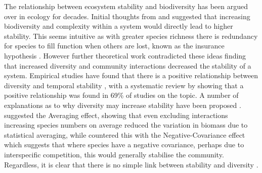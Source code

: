 The relationship between ecosystem stability and biodiversity has been argued over in ecology for decades. Initial thoughts from \cite{Elton1958} and \cite{MacArthur1955} suggested that increasing biodiversity and complexity within a system would directly lead to higher stability. This seems intuitive as with greater species richness there is redundancy for species to fill function when others are lost, known as the insurance hypothesis \citep{Yachi1999}. However further theoretical work contradicted these ideas \citep{May1973} finding that increased diversity and community interactions decreased the stability of a system. Empirical studies have found that there is a positive relationship between diversity and temporal stability \citep{Tilman1994, Tilman2006}, with a systematic review by \cite{Ives2007} showing that a positive relationship was found in 69\% of studies on the topic. A number of explanations as to why diversity may increase stability have been proposed \citep{McCann2000}. \cite{Doak1998} suggested the Averaging effect, showing that even excluding interactions increasing species numbers on average reduced the variation in biomass due to statistical averaging, while \cite{Tilman1998} countered this with the Negative-Covariance effect which suggests that where species have a negative covariance, perhaps due to interspecific competition, this would generally stabilise the community. Regardless, it is clear that there is no simple link between stability and diversity \citep{Goodman1975}.


